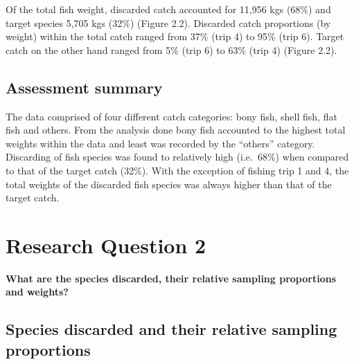 \documentclass[
]{book}
\begin{document}
Of the total fish weight, discarded catch accounted for 11,956 kgs (68\%) and target species 5,705 kgs (32\%) (Figure 2.2). Discarded catch proportions (by weight) within the total catch ranged from 37\% (trip 4) to 95\% (trip 6). Target catch on the other hand ranged from 5\% (trip 6) to 63\% (trip 4) (Figure 2.2).

\hypertarget{assessment-summary}{%
\subsection{Assessment summary}\label{assessment-summary}}

The data comprised of four different catch categories: bony fish, shell fish, flat fish and others. From the analysis done bony fish accounted to the highest total weights within the data and least was recorded by the ``others'' category. Discarding of fish species was found to relatively high (i.e.~68\%) when compared to that of the target catch (32\%). With the exception of fishing trip 1 and 4, the total weights of the discarded fish species was always higher than that of the target catch.

\hypertarget{research-question-2}{%
\section{Research Question 2}\label{research-question-2}}

\textbf{What are the species discarded, their relative sampling proportions and weights?}

\hypertarget{species-discarded-and-their-relative-sampling-proportions}{%
\subsection{Species discarded and their relative sampling proportions}\label{species-discarded-and-their-relative-sampling-proportions}}
\end{document}
